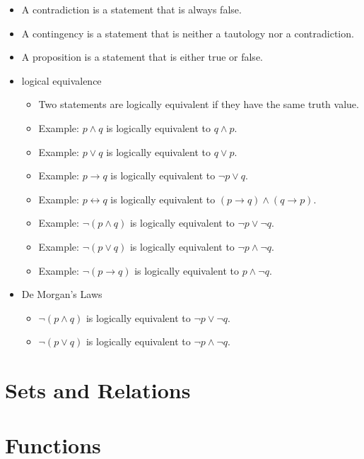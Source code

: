 \documentclass{article}
\begin{document}
\begin{itemize}
\begin{itemize}
    \item A contradiction is a statement that is always false.
    \item A contingency is a statement that is neither a tautology nor a contradiction.
    \item A proposition is a statement that is either true or false.
    \item logical equivalence
    \begin{itemize}
        \item Two statements are logically equivalent if they have the same truth value.
        \item Example: $p \land q$ is logically equivalent to $q \land p$.
        \item Example: $p \lor q$ is logically equivalent to $q \lor p$.
        \item Example: $p \rightarrow q$ is logically equivalent to $\neg p \lor q$.
        \item Example: $p \leftrightarrow q$ is logically equivalent to $(p \rightarrow q) \land (q \rightarrow p)$.
        \item Example: $\neg(p \land q)$ is logically equivalent to $\neg p \lor \neg q$.
        \item Example: $\neg(p \lor q)$ is logically equivalent to $\neg p \land \neg q$.
        \item Example: $\neg(p \rightarrow q)$ is logically equivalent to $p \land \neg q$.
    \end{itemize}
    \item De Morgan's Laws
    \begin{itemize}
        \item $\neg(p \land q)$ is logically equivalent to $\neg p \lor \neg q$.
        \item $\neg(p \lor q)$ is logically equivalent to $\neg p \land \neg q$.
    \end{itemize}
\end{itemize}

\section{Sets and Relations}


\section{Functions}



\end{itemize}
\end{document}

